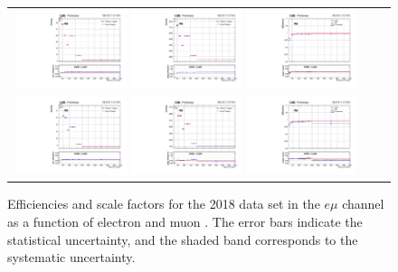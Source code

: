\begin{figure}[h]
  \begin{center}
    \begin{tabular}{ccc}
      \includegraphics[width=0.32\textwidth]{fig_2018_TrigSF/g_lepApt_emu_MC.pdf}
      \includegraphics[width=0.32\textwidth]{fig_2018_TrigSF/g_lepApt_emu_data.pdf}
      \includegraphics[width=0.32\textwidth]{fig_2018_TrigSF/g_emu_lepApt_FullSystUncBand.pdf}\\
      \includegraphics[width=0.32\textwidth]{fig_2018_TrigSF/g_lepBpt_emu_MC.pdf}
      \includegraphics[width=0.32\textwidth]{fig_2018_TrigSF/g_lepBpt_emu_data.pdf}
      \includegraphics[width=0.32\textwidth]{fig_2018_TrigSF/g_emu_lepBpt_FullSystUncBand.pdf}\\
    \end{tabular}
    \caption{Efficiencies and scale factors for the 2018 data set in the $e\mu$ channel as a function of electron and muon \pT.
            The error bars indicate the statistical uncertainty, and the shaded band corresponds to the systematic uncertainty.
            }
    \label{TrigSF_2018_1}
  \end{center}
\end{figure}

